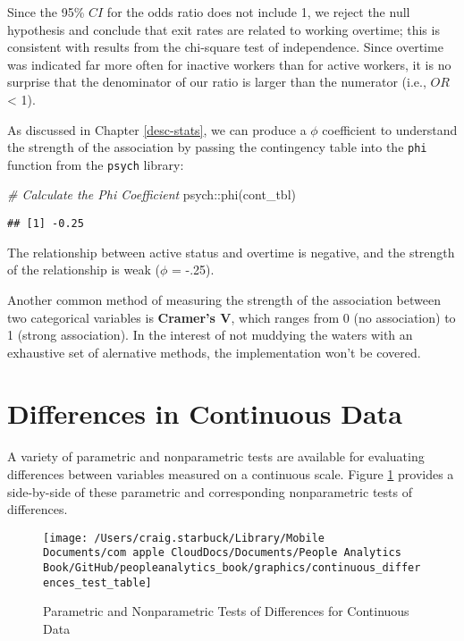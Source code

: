 \documentclass[
]{book}
\newenvironment{Shaded}{\begin{snugshade}}{\end{snugshade}}
\newcommand{\CommentTok}[1]{\textcolor[rgb]{0.56,0.35,0.01}{\textit{#1}}}
\newcommand{\FunctionTok}[1]{\textcolor[rgb]{0.00,0.00,0.00}{#1}}
\newcommand{\NormalTok}[1]{#1}
\newcommand{\SpecialCharTok}[1]{\textcolor[rgb]{0.00,0.00,0.00}{#1}}
\begin{document}
Since the 95\% \(CI\) for the odds ratio does not include 1, we reject the null hypothesis and conclude that exit rates are related to working overtime; this is consistent with results from the chi-square test of independence. Since overtime was indicated far more often for inactive workers than for active workers, it is no surprise that the denominator of our ratio is larger than the numerator (i.e., \(OR\) \textless{} 1).

As discussed in Chapter \ref{desc-stats}, we can produce a \(\phi\) coefficient to understand the strength of the association by passing the contingency table into the \texttt{phi} function from the \texttt{psych} library:

\begin{Shaded}
\begin{Highlighting}[]
\CommentTok{\# Calculate the Phi Coefficient}
\NormalTok{psych}\SpecialCharTok{::}\FunctionTok{phi}\NormalTok{(cont\_tbl)}
\end{Highlighting}
\end{Shaded}

\begin{verbatim}
## [1] -0.25
\end{verbatim}

The relationship between active status and overtime is negative, and the strength of the relationship is weak (\(\phi\) = -.25).

Another common method of measuring the strength of the association between two categorical variables is \textbf{Cramer's V}, which ranges from 0 (no association) to 1 (strong association). In the interest of not muddying the waters with an exhaustive set of alernative methods, the implementation won't be covered.

\hypertarget{differences-in-continuous-data}{%
\section{Differences in Continuous Data}\label{differences-in-continuous-data}}

A variety of parametric and nonparametric tests are available for evaluating differences between variables measured on a continuous scale. Figure \ref{fig:continuous-tests} provides a side-by-side of these parametric and corresponding nonparametric tests of differences.

\begin{figure}

{\centering \texttt{[image: /Users/craig.starbuck/Library/Mobile Documents/com~apple~CloudDocs/Documents/People Analytics Book/GitHub/peopleanalytics\_book/graphics/continuous\_differences\_test\_table]} 

}

\caption{Parametric and Nonparametric Tests of Differences for Continuous Data}\label{fig:continuous-tests}
\end{figure}
\end{document}
